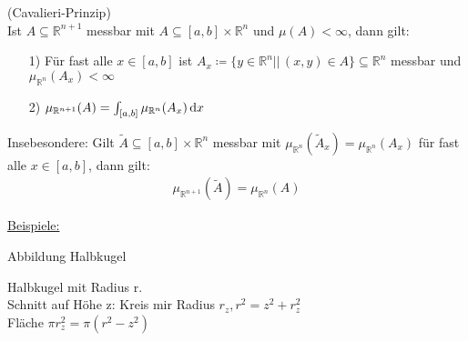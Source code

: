 \begin{satz}
    (Cavalieri-Prinzip)\\
    Ist $A\subseteq\mathbb{R}^{n+1}$ messbar mit $A\subseteq[a,b]\times\mathbb{R}^n$ und $\mu (A) < \infty$, dann gilt:
    \begin{itemize}
        \item[1)] Für fast alle $x\in[a,b]$ ist $A_x\coloneqq\{y\in\mathbb{R}^n||\, (x,y)\in A\}\subseteq\mathbb{R}^n$ messbar und $\mu_{\mathbb{R}^n}(A_x) <\infty$
        \item[2)]$\mu_{\mathbb{R}^{n+1}}(A) = \int_{{[a,b]}} {\mu_{\mathbb{R}^n}(A_x)} \,\text{d}x$
    \end{itemize}
    Insebesondere: Gilt $\tilde{A} \subseteq [a,b]\times\mathbb{R}^n$ messbar mit $\mu_{\mathbb{R}^n}(\tilde{A}_x)=\mu_{\mathbb{R}^n}(A_x)$ für fast alle $x\in[a,b]$, dann gilt:
    \begin{align*}
        \mu_{\mathbb{R}^{n+1}}(\tilde{A})=\mu_{\mathbb{R}^n}(A)
    \end{align*}
\end{satz}

\underline{Beispiele:}\\
\begin{minipage}{0.333\textwidth}
    Abbildung Halbkugel
\end{minipage}
\begin{minipage}{0.666\textwidth}
Halbkugel mit Radius r.\\
Schnitt auf Höhe z: Kreis mir Radius $r_z, r^2 = z^2 +r_z^2$\\
Fläche $\pi r_z^2 = \pi(r^2-z^2)$
\end{minipage}

